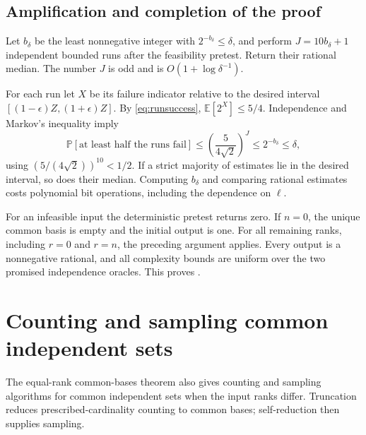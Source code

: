 \documentclass[11pt]{article}
\theoremstyle{definition}
\newcommand{\E}{\mathbb E}
\newcommand{\Prob}{\mathbb P}
\begin{document}
\subsection{Amplification and completion of the proof}

Let $b_\delta$ be the least nonnegative integer with
$2^{-b_\delta}\le\delta$, and perform
$J=10b_\delta+1$ independent bounded runs after the feasibility pretest.
Return their rational median.  The number $J$ is odd and is
$O(1+\log\delta^{-1})$.

For each run let $X$ be its failure indicator relative to the desired
interval $[(1-\epsilon)Z,(1+\epsilon)Z]$.  By
\eqref{eq:runsuccess}, $\E[2^X]\le5/4$.  Independence and Markov's
inequality imply
\[
 \Prob[\text{at least half the runs fail}]
 \le\left(\frac{5}{4\sqrt2}\right)^J
 \le2^{-b_\delta}\le\delta,
\]
using $(5/(4\sqrt2))^{10}<1/2$.  If a strict majority of estimates lie
in the desired interval, so does their median.  Computing $b_\delta$
and comparing rational estimates costs polynomial bit operations,
including the dependence on $\ell$.

For an infeasible input the deterministic pretest returns zero.  If
$n=0$, the unique common basis is empty and the initial output is one.
For all remaining ranks, including $r=0$ and $r=n$, the preceding
argument applies.  Every output is a nonnegative rational, and all
complexity bounds are uniform over the two promised independence
oracles.  This proves .

\section{Counting and sampling common independent sets}
\label{sec:intersection}

The equal-rank common-bases theorem also gives counting and sampling
algorithms for common independent sets when the input ranks differ.
Truncation reduces prescribed-cardinality counting to common bases;
self-reduction then supplies sampling.
\end{document}
